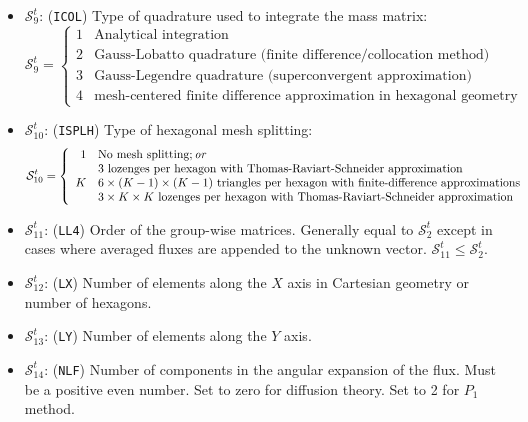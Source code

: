 \begin{itemize}
\item $\mathcal{S}^{t}_{9}$: ({\tt ICOL}) Type of quadrature used to integrate
the mass matrix:
\begin{displaymath}
\mathcal{S}^{t}_{9} = \left\{
\begin{array}{rl}
 1 & \textrm{Analytical integration} \\
 2 & \textrm{Gauss-Lobatto quadrature (finite difference/collocation method)} \\
 3 & \textrm{Gauss-Legendre quadrature (superconvergent approximation)} \\
 4 & \textrm{mesh-centered finite difference approximation in hexagonal geometry}
\end{array} \right.
\end{displaymath}

\item $\mathcal{S}^{t}_{10}$: ({\tt ISPLH}) Type of hexagonal mesh splitting:
\begin{displaymath}
\mathcal{S}^{t}_{10} = \left\{
\begin{array}{rl}
 1 & \textrm{No mesh splitting}; \emph{or} \\
   & \textrm{$3$ lozenges per hexagon with Thomas-Raviart-Schneider approximation} \\
 K & \textrm{$6\times(K-1)\times(K-1)$ triangles per hexagon with finite-difference approximations} \\
   & \textrm{$3\times K \times K$ lozenges per hexagon with Thomas-Raviart-Schneider approximation}
\end{array} \right.
\end{displaymath}

\item $\mathcal{S}^{t}_{11}$: ({\tt LL4}) Order of the group-wise matrices.
Generally equal to
$\mathcal{S}^{t}_{2}$ except in cases where averaged fluxes are appended to the
unknown vector. $\mathcal{S}^{t}_{11}\le\mathcal{S}^{t}_{2}$.

\item $\mathcal{S}^{t}_{12}$: ({\tt LX}) Number of elements along the $X$ axis in Cartesian geometry or number of
hexagons.

\item $\mathcal{S}^{t}_{13}$: ({\tt LY}) Number of elements along the $Y$ axis.

\item $\mathcal{S}^{t}_{14}$: ({\tt NLF}) Number of components in the angular expansion of the flux. Must be a positive
even number. Set to zero for diffusion theory. Set to 2 for $P_1$ method.


\end{itemize}
